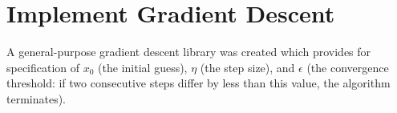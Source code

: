 \documentclass{article}
\begin{document}
\section{Implement Gradient Descent}
A general-purpose gradient descent library was created which provides for specification of $x_0$ (the initial guess), $\eta$ (the step size), and $\epsilon$ (the convergence threshold: if two consecutive steps differ by less than this value, the algorithm terminates).



\nocite{langley00}



\end{document}
